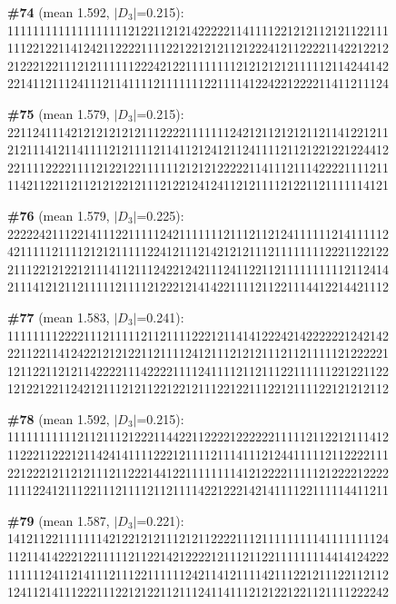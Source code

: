 \documentclass[10pt]{article}
\begin{document}
\noindent\textbf{\#74} (mean 1.592, $|D_3|$=0.215):\\
111111111111111111121221121214222221141111221212112121122111\\
111221221141242112222111122122121211212224121122221142212212\\
212221221112121111112224212211111111212121212111112114244142\\
221411211124111211411112111111122111141224221222211411211124\medskip

\noindent\textbf{\#75} (mean 1.579, $|D_3|$=0.215):\\
221124111421212121212111222211111112421211212121121141221211\\
212111412114111121211112114112124121124111121121221221224412\\
221111222211112122122111111212121222221141112111422221111211\\
114211221121121212212111212212412411212111121221121111114121\medskip

\noindent\textbf{\#76} (mean 1.579, $|D_3|$=0.225):\\
222224211122141112211111242111111121112112124111111214111112\\
421111121111212121111122412111214212121112111111112221122122\\
211122121221211141121112422124211124112211211111111112112414\\
211141212112111112111121222121414221111211221114412214421112\medskip

\noindent\textbf{\#77} (mean 1.583, $|D_3|$=0.241):\\
111111112222111211111211211112221211414122242142222221242142\\
221122114124221212122112111124121112121211121121111121222221\\
121122112121142222111422221111241111211211122111111221221122\\
121221221124212111212112212212111221221112212111122121212112\medskip

\noindent\textbf{\#78} (mean 1.592, $|D_3|$=0.215):\\
111111111112112111212221144221122221222222111112112212111412\\
112221122212114241411112221211112111411121244111112112222111\\
221222121121211121122214412211111111412122221111121222212222\\
111122412111221112111121121111422122214214111122111114411211\medskip

\noindent\textbf{\#79} (mean 1.587, $|D_3|$=0.221):\\
141211221111111421221212111212112222111211111111141111111124\\
112114142221221111121122142122221211121122111111114414124222\\
111111241121411121112211111124211412111142111221211122112112\\
124112141112221112212122112111241141112121221221121111222242\medskip
\end{document}
